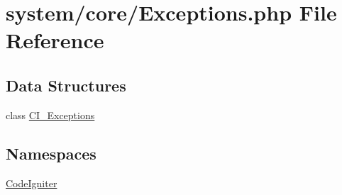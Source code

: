 \hypertarget{_exceptions_8php}{}\section{system/core/\+Exceptions.php File Reference}
\label{_exceptions_8php}
\subsection*{Data Structures}
\begin{DoxyCompactItemize}
\item 
class \mbox{\hyperlink{class_c_i___exceptions}{C\+I\+\_\+\+Exceptions}}
\end{DoxyCompactItemize}
\subsection*{Namespaces}
\begin{DoxyCompactItemize}
\item 
 \mbox{\hyperlink{namespace_code_igniter}{Code\+Igniter}}
\end{DoxyCompactItemize}
